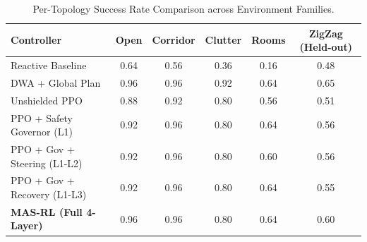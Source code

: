 \begin{table}[h]
\centering
\caption{Per-Topology Success Rate Comparison across Environment Families.}
\label{tab:family_breakdown}
\begin{tabular}{lccccc}
\hline\hline
\textbf{Controller} & \textbf{Open} & \textbf{Corridor} & \textbf{Clutter} & \textbf{Rooms} & \textbf{ZigZag (Held-out)} \\
\hline
Reactive Baseline & 0.64 & 0.56 & 0.36 & 0.16 & 0.48 \\
DWA + Global Plan & 0.96 & 0.96 & 0.92 & 0.64 & 0.65 \\
Unshielded PPO & 0.88 & 0.92 & 0.80 & 0.56 & 0.51 \\
PPO + Safety Governor (L1) & 0.92 & 0.96 & 0.80 & 0.64 & 0.56 \\
PPO + Gov + Steering (L1-L2) & 0.92 & 0.96 & 0.80 & 0.60 & 0.56 \\
PPO + Gov + Recovery (L1-L3) & 0.92 & 0.96 & 0.80 & 0.64 & 0.55 \\
\textbf{MAS-RL (Full 4-Layer)} & 0.96 & 0.96 & 0.80 & 0.64 & 0.60 \\
\hline\hline
\end{tabular}
\end{table}